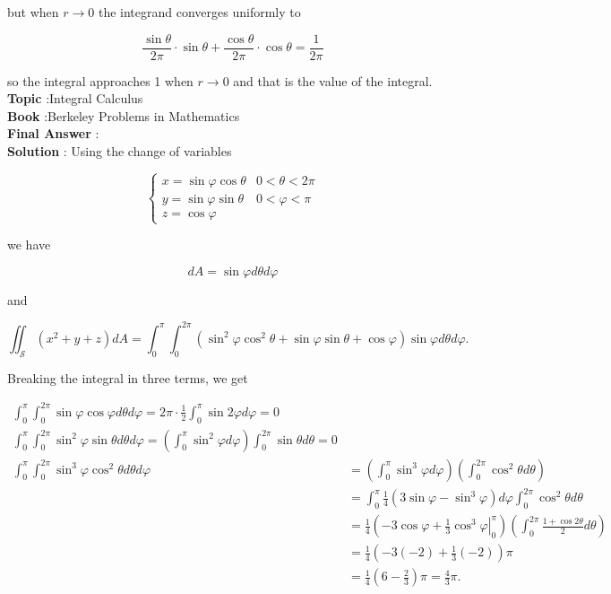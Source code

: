 \documentclass[10pt]{article}
\begin{document}
but when $r \rightarrow 0$ the integrand converges uniformly to

$$
\frac{\sin \theta}{2 \pi} \cdot \sin \theta+\frac{\cos \theta}{2 \pi} \cdot \cos \theta=\frac{1}{2 \pi}
$$

so the integral approaches 1 when $r \rightarrow 0$ and that is the value of the integral.
\textbf{Topic} :Integral Calculus \\
\textbf{Book} :Berkeley Problems in Mathematics\\
\textbf{Final Answer} :\\


\textbf{Solution} : Using the change of variables

$$
\begin{cases}x=\sin \varphi \cos \theta & 0<\theta<2 \pi \\ y=\sin \varphi \sin \theta & 0<\varphi<\pi \\ z=\cos \varphi & \end{cases}
$$

we have

$$
d A=\sin \varphi d \theta d \varphi
$$

and

$$
\iint_{\mathcal{S}}\left(x^{2}+y+z\right) d A=\int_{0}^{\pi} \int_{0}^{2 \pi}\left(\sin ^{2} \varphi \cos ^{2} \theta+\sin \varphi \sin \theta+\cos \varphi\right) \sin \varphi d \theta d \varphi .
$$

Breaking the integral in three terms, we get

$$
\begin{aligned}
\int_{0}^{\pi} \int_{0}^{2 \pi} \sin \varphi \cos \varphi d \theta d \varphi=2 \pi \cdot \frac{1}{2} \int_{0}^{\pi} \sin 2 \varphi d \varphi=0 \\
\int_{0}^{\pi} \int_{0}^{2 \pi} \sin ^{2} \varphi \sin \theta d \theta d \varphi=\left(\int_{0}^{\pi} \sin ^{2} \varphi d \varphi\right) \int_{0}^{2 \pi} \sin \theta d \theta=0 \\
\int_{0}^{\pi} \int_{0}^{2 \pi} \sin ^{3} \varphi \cos ^{2} \theta d \theta d \varphi &=\left(\int_{0}^{\pi} \sin ^{3} \varphi d \varphi\right)\left(\int_{0}^{2 \pi} \cos ^{2} \theta d \theta\right) \\
&=\int_{0}^{\pi} \frac{1}{4}\left(3 \sin \varphi-\sin ^{3} \varphi\right) d \varphi \int_{0}^{2 \pi} \cos ^{2} \theta d \theta \\
&=\frac{1}{4}\left(-3 \cos \varphi+\left.\frac{1}{3} \cos ^{3} \varphi\right|_{0} ^{\pi}\right)\left(\int_{0}^{2 \pi} \frac{1+\cos 2 \theta}{2} d \theta\right) \\
&=\frac{1}{4}\left(-3(-2)+\frac{1}{3}(-2)\right) \pi \\
&=\frac{1}{4}\left(6-\frac{2}{3}\right) \pi=\frac{4}{3} \pi .
\end{aligned}
$$
\end{document}
